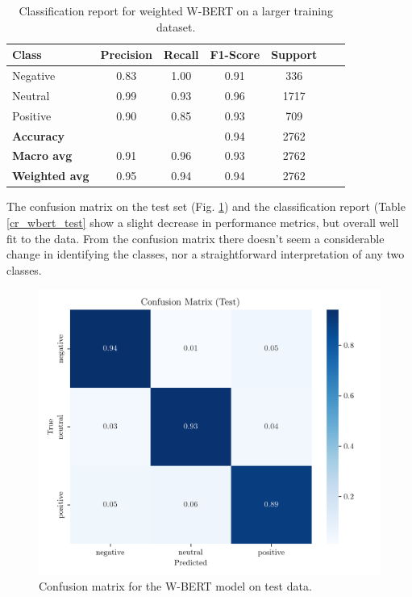 \documentclass[conference]{IEEEtran}
\begin{document}
\begin{table}[H]
\centering
\caption{Classification report for weighted W-BERT on a larger training dataset.}
\label{cr_weightbert_train}
\begin{tabular}{lcccccc}
\toprule
\textbf{Class} & \textbf{Precision} & \textbf{Recall} & \textbf{F1-Score} & \textbf{Support} \\
\midrule
Negative & 0.83 & 1.00 & 0.91 & 336 \\
Neutral & 0.99 & 0.93 & 0.96 & 1717 \\
Positive & 0.90 & 0.85 & 0.93 & 709 \\
\midrule
\textbf{Accuracy} &  &  & 0.94 & 2762 \\
\textbf{Macro avg} & 0.91 & 0.96 & 0.93 & 2762 \\
\textbf{Weighted avg} & 0.95 & 0.94 & 0.94 & 2762 \\
\bottomrule
\end{tabular}
\end{table}

The confusion matrix on the test set (Fig. \ref{fig:weighted_bert_confusion_matrix_Test}) and the classification report (Table \ref{cr_wbert_test} show a slight decrease in performance metrics, but overall well fit to the data. From the confusion matrix there doesn't seem a considerable change in identifying the classes, nor a straightforward interpretation of any two classes.

\begin{figure}[H]
    \centering
    \includegraphics[width=1\linewidth]{assets/weighted_bert_confusion_matrix_Test.png}
    \caption{Confusion matrix for the W-BERT model on test data.}
    \label{fig:weighted_bert_confusion_matrix_Test}
\end{figure}
\end{document}
